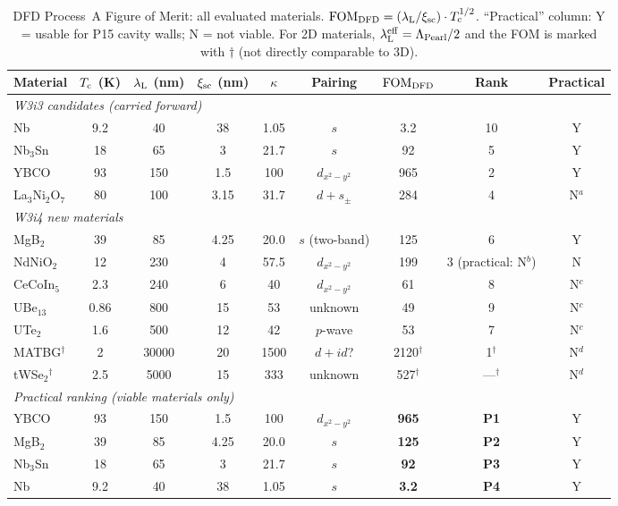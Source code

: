 \documentclass[11pt]{article}
\newcommand{\lambdaL}{\lambda_{\rm L}}
\newcommand{\xsc}{\xi_{\rm sc}}
\newcommand{\Tc}{T_{\rm c}}
\newcommand{\FOM}{\mathrm{FOM}}
\begin{document}
\begin{table}[H]
\centering
\caption{DFD Process~A Figure of Merit: all evaluated materials.
  $\FOM_{\rm DFD} = (\lambdaL/\xsc)\cdot\Tc^{1/2}$.
  ``Practical'' column: Y = usable for P15 cavity walls; N = not viable.
  For 2D materials, $\lambdaL^{\rm eff} = \Lambda_{\rm Pearl}/2$ and
  the FOM is marked with $\dagger$ (not directly comparable to 3D).}
\label{tab:fom}
\small
\begin{tabular}{lcccccccc}
\toprule
Material & $\Tc$ (K) & $\lambdaL$ (nm) & $\xsc$ (nm)
  & $\kappa$ & Pairing & $\FOM_{\rm DFD}$ & Rank & Practical \\
\midrule
\multicolumn{9}{l}{\textit{W3i3 candidates (carried forward)}} \\
Nb            & 9.2  & 40   & 38   & 1.05 & $s$      & 3.2    & 10 & Y \\
Nb$_3$Sn      & 18   & 65   & 3    & 21.7 & $s$      & 92     & 5  & Y \\
YBCO          & 93   & 150  & 1.5  & 100  & $d_{x^2-y^2}$ & 965 & 2 & Y \\
La$_3$Ni$_2$O$_7$ & 80 & 100 & 3.15 & 31.7 & $d+s_\pm$ & 284 & 4 & N$^a$ \\
\midrule
\multicolumn{9}{l}{\textit{W3i4 new materials}} \\
MgB$_2$       & 39   & 85   & 4.25 & 20.0 & $s$ (two-band) & 125 & 6 & Y \\
NdNiO$_2$     & 12   & 230  & 4    & 57.5 & $d_{x^2-y^2}$ & 199 & 3 (practical: N$^b$) & N \\
CeCoIn$_5$    & 2.3  & 240  & 6    & 40   & $d_{x^2-y^2}$ & 61 & 8  & N$^c$ \\
UBe$_{13}$    & 0.86 & 800  & 15   & 53   & unknown  & 49     & 9  & N$^c$ \\
UTe$_2$       & 1.6  & 500  & 12   & 42   & $p$-wave & 53     & 7  & N$^c$ \\
MATBG$^\dagger$ & 2  & 30000 & 20  & 1500 & $d+id$?  & 2120$^\dagger$ & 1$^\dagger$ & N$^d$ \\
tWSe$_2$$^\dagger$ & 2.5 & 5000 & 15 & 333 & unknown & 527$^\dagger$ & ---$^\dagger$ & N$^d$ \\
\midrule
\multicolumn{9}{l}{\textit{Practical ranking (viable materials only)}} \\
YBCO          & 93   & 150  & 1.5  & 100  & $d_{x^2-y^2}$ & \textbf{965} & \textbf{P1} & Y \\
MgB$_2$       & 39   & 85   & 4.25 & 20.0 & $s$      & \textbf{125} & \textbf{P2} & Y \\
Nb$_3$Sn      & 18   & 65   & 3    & 21.7 & $s$      & \textbf{92}  & \textbf{P3} & Y \\
Nb            & 9.2  & 40   & 38   & 1.05 & $s$      & \textbf{3.2} & \textbf{P4} & Y \\
\bottomrule
\end{tabular}
\vspace{1mm}


\end{table}
\end{document}
